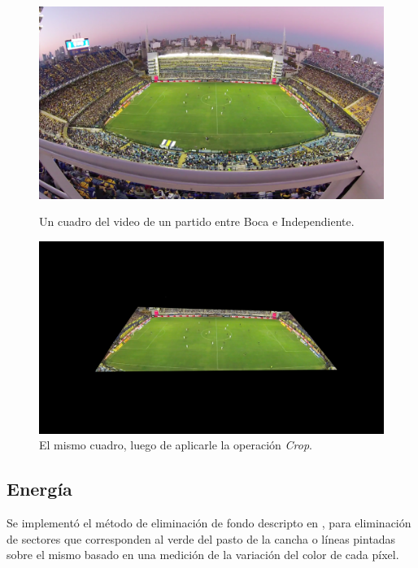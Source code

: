 \begin{figure}[H]
  \centering
    \begin{minipage}[t]{.45\textwidth}
      \includegraphics[width=\linewidth]{./images/Crop_Antes.png}
      \caption{Un cuadro del video de un partido entre Boca e Independiente.
      \label{fig:crop-antes}}
    \end{minipage}
    \begin{minipage}[t]{.45\textwidth}
      \centering
      \includegraphics[width=\linewidth]{./images/Crop_Despues.png}
      \caption{El mismo cuadro, luego de aplicarle la operación \textit{Crop}.
      \label{fig:crop-despues}}
    \end{minipage}
\end{figure}

\subsection{Energía}

Se implementó el método de eliminación de fondo descripto en
\cite{papers-tanos}, para eliminación de sectores que corresponden al
verde del pasto de la cancha o líneas pintadas sobre el mismo basado
en una medición de la variación del color de cada píxel.

